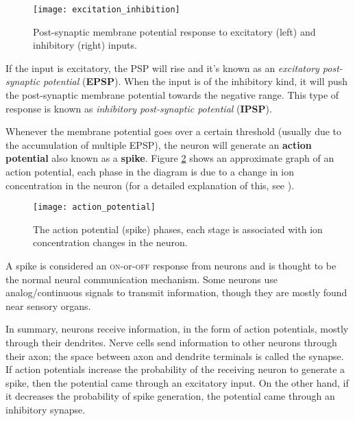 \begin{figure}[hbt]
  \begin{center}
    \texttt{[image: excitation\_inhibition]}
    \caption{Post-synaptic membrane potential response to excitatory (left) and inhibitory (right) inputs.}
    \label{fig:neuro:exc_inh}
  \end{center}
\end{figure}

If the input is excitatory, the PSP will rise and it's known as an \emph{excitatory post-synaptic potential} (\textbf{EPSP}). When the input is of the inhibitory kind, it will push the post-synaptic membrane potential towards the negative range. This type of response is known as \emph{inhibitory post-synaptic potential} (\textbf{IPSP}).

Whenever the membrane potential goes over a certain threshold (usually due to the accumulation of multiple EPSP), the neuron will generate an \textbf{action potential} also known as a \textbf{spike}. Figure \ref{fig:neuro:spike} shows an approximate graph of an action potential, each phase in the diagram is due to a change in ion concentration in the neuron (for a detailed explanation of this, see \cite{thompson2000brain}).

\begin{figure}[hbt]
  \begin{center}
    \texttt{[image: action\_potential]}
    \caption{The action potential (spike) phases, each stage is associated with ion concentration changes in the neuron.}
    \label{fig:neuro:spike}
  \end{center}
\end{figure}

A spike is considered an \textsc{on}-or-\textsc{off} response from neurons and is thought to be the normal neural communication mechanism. Some neurons use analog/continuous signals to transmit information, though they are mostly found near sensory organs.

In summary, neurons receive information, in the form of action potentials, mostly through their dendrites. Nerve cells send information to other neurons through their axon; the space between axon and dendrite terminals is called the synapse. If action potentials increase the probability of the receiving neuron to generate a spike, then the potential came through an excitatory input. On the other hand, if it decreases the probability of spike generation, the potential came through an inhibitory synapse.

